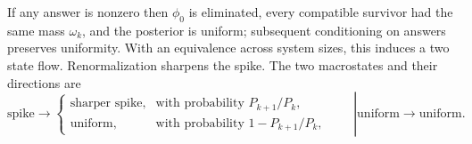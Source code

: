 \documentclass[11pt]{article}
\begin{document}
If any answer is nonzero then $\phi_0$ is eliminated, every
compatible survivor had the same mass $\omega_k$, and the posterior is
uniform; subsequent conditioning on answers preserves uniformity. With an equivalence across system sizes, this induces a two state flow. Renormalization sharpens the spike. The two
macrostates and their directions are
%
\begin{equation}
  \left. \text{spike}\longrightarrow
  \begin{cases}
    \text{sharper spike}, & \text{with probability } P_{k+1}/P_k,\\
    \text{uniform}, & \text{with probability } 1 - P_{k+1}/P_k,
  \end{cases}
  \qquad \right|
  \text{uniform}\longrightarrow\text{uniform}.
  \label{eq:spikeflow}
\end{equation}
%
\end{document}
